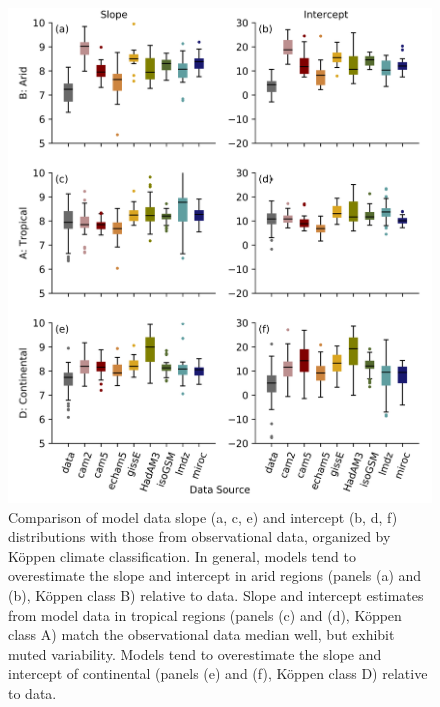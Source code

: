 \documentclass[draft, linenumbers]{agujournal2018}
\begin{document}
\begin{figure}
  \centering
  \includegraphics[width = 6in]{Figs/Fig6.png}
  \caption{Comparison of model data slope (a, c, e) and intercept (b, d, f) distributions with those from observational data, organized by K{\"o}ppen climate classification. In general, models tend to overestimate the slope and intercept in arid regions (panels (a) and (b), K{\"o}ppen class B)  relative to data. Slope and intercept estimates from model data in tropical regions (panels (c) and (d), K{\"o}ppen class A) match the observational data median well, but exhibit muted variability. Models tend to overestimate the slope and intercept of continental (panels (e) and (f), K{\"o}ppen class D) relative to data.}
  \label{fig:ModDataSubsets}
\end{figure}
\end{document}
